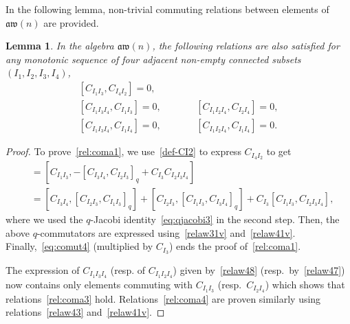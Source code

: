 \documentclass[pdftex]{sigma}
\numberwithin{equation}{section}
\newtheorem{lemm}[theo]{Lemma}
\theoremstyle{definition}
\newcommand{\aw}{\mathfrak{aw}(n)}
\begin{document}
In the following lemma, non-trivial commuting relations between elements of $\aw$ are provided.
\begin{lemm}\label{lemm:relcom2}
In the algebra $\aw$, the following relations are also satisfied for any monotonic sequence of four adjacent non-empty connected subsets $(I_1,I_2,I_3,I_4)$,
\begin{subequations}%
\begin{alignat}{3}
 & [C_{I_1I_3}, C_{I_4I_2} ]=0 ,&&& \label{rel:coma1}\\
 & [C_{I_1I_3I_4}, C_{I_1I_3}]=0 , \qquad&& [C_{I_1I_2I_4}, C_{I_2I_4}]=0 , &\label{rel:coma3}\\
 & [C_{I_1I_3I_4}, C_{I_1I_4}]=0 , \qquad&& [C_{I_1I_2I_4}, C_{I_1I_4}]=0.&\label{rel:coma4}
\end{alignat}
\end{subequations}
\end{lemm}

\begin{proof}
To prove~\eqref{rel:coma1}, we use~\eqref{def-CI2} to express $C_{I_4I_2}$ to get
\begin{align*}
[C_{I_1I_3}, C_{I_4I_2} ]&= [C_{I_1I_3}, -[C_{I_3I_4},C_{I_2I_3}]_q +C_{I_3}C_{I_2I_3I_4}]
\\
&= [C_{I_3I_4}, [C_{I_2I_3},C_{I_1I_3}]_q] + [C_{I_2I_3}, [C_{I_1I_3},C_{I_3I_4}]_q] +C_{I_3}[C_{I_1I_3},C_{I_2I_3I_4}],
\end{align*}
where we used the $q$-Jacobi identity~\eqref{eq:qjacobi3} in the second step. Then, the above $q$-commutators are expressed using~\eqref{relaw31v} and~\eqref{relaw41v}.
Finally,~\eqref{eq:comut4} (multiplied by $C_{I_3}$) ends the proof of~\eqref{rel:coma1}.

The expression of $C_{I_1I_3I_4}$ (resp. of $C_{I_1I_2I_4}$) given by~\eqref{relaw48} (resp.\ by~\eqref{relaw47}) now contains only elements commuting with $C_{I_1I_3}$ (resp.\ $C_{I_2I_4}$)
which shows that relations~\eqref{rel:coma3} hold. Relations~\eqref{rel:coma4} are proven similarly using relations~\eqref{relaw43} and~\eqref{relaw41v}.
\end{proof}
\end{document}
